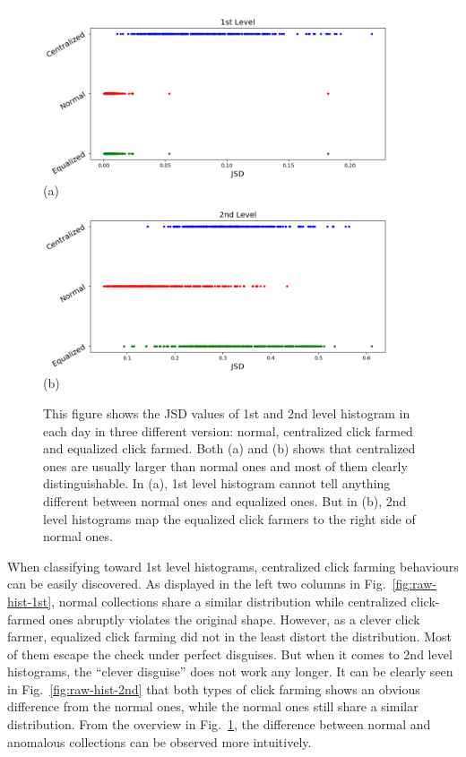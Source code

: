 \documentclass[10pt,conference,letterpaper]{IEEEtran}
\begin{document}
			\begin{figure}[!t]
				\centering
				\includegraphics[width=\linewidth]{fig/RawOverview1st.png}
				(a)
				\includegraphics[width=\linewidth]{fig/RawOverview2nd.png}
				(b)
				\caption{This figure shows the JSD values of 1st and 2nd level histogram in each day in three different version: normal, centralized click farmed and equalized click farmed. Both (a) and (b) shows that centralized ones are usually larger than normal ones and most of them clearly distinguishable. In (a), 1st level histogram cannot tell anything different between normal ones and equalized ones. But in (b), 2nd level histograms map the equalized click farmers to the right side of normal ones.}
				\label{fig:raw-overview}
			\end{figure}
	
			When classifying toward 1st level histograms, centralized click farming behaviours can be easily discovered. As displayed in the left two columns in Fig.~\ref{fig:raw-hist-1st}, normal collections share a similar distribution while centralized click-farmed ones abruptly violates the original shape. However, as a clever click farmer, equalized click farming did not in the least distort the distribution. Most of them escape the check under perfect disguises.
			But when it comes to 2nd level histograms, the ``clever disguise'' does not work any longer. It can be clearly seen in Fig.~\ref{fig:raw-hist-2nd} that both types of click farming shows an obvious difference from the normal ones, while the normal ones still share a similar distribution.
			From the overview in Fig.~\ref{fig:raw-overview}, the difference between normal and anomalous collections can be observed more intuitively.
	
\end{document}
